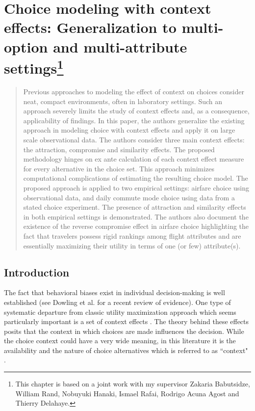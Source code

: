 \documentclass[a4paper,12pt]{article}
\newcommand{\citeyearonly}[1]{\citeyearpar{#1}}
\begin{document}
\section{Choice modeling with context effects:
Generalization to multi-option and multi-attribute settings\footnote{This chapter is based on a joint work with my supervisor Zakaria Babutsidze, William Rand, Nobuyuki Hanaki, Ismael Rafai, Rodrigo Acuna Agost and Thierry Delahaye.}}\label{chapter:jmrPaper} 


\begin{abstract}

    Previous approaches to modeling the effect of context on choices consider neat, compact environments, often in laboratory settings. Such an approach severely limits the study of context effects and, as a consequence, applicability of findings. In this paper, the authors generalize the existing approach in modeling choice with context effects and apply it on large scale observational data. The authors consider three main context effects: the attraction, compromise and similarity effects. The proposed methodology hinges on ex ante calculation of each context effect measure for every alternative in the choice set. This approach minimizes computational complications of estimating the resulting choice model. The proposed approach is applied to two empirical settings: airfare choice using observational data, and daily commute mode choice using data from a stated choice experiment. The presence of attraction and similarity effects in both empirical settings is demonstrated. The authors also document the existence of the reverse compromise effect in airfare choice highlighting the fact that travelers possess rigid rankings among flight attributes and are essentially maximizing their utility in terms of one (or few) attribute(s).
    
\end{abstract}

\subsection{Introduction}

The fact that behavioral biases exist in individual decision-making is well established (see Dowling et al. \citeyearonly{dowlingEtAl20} for a recent review of evidence). One type of systematic departure from classic utility maximization approach which seems particularly important is a set of context effects \citep{truebloodEtAl13, kocherEtAl19}. The theory behind these effects posits that the context in which choices are made influences the decision. While the choice context could have a very wide meaning, in this literature it is the availability and the nature of choice alternatives which is referred to as ``context" \citep{tversky1972elimination, huberEtAl82, simonson89}.
\end{document}
